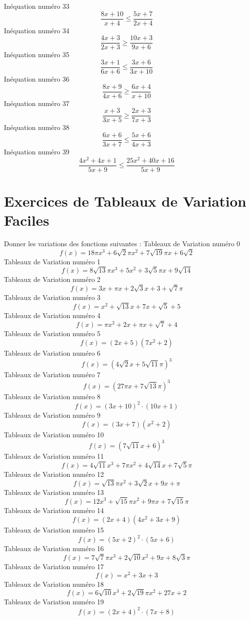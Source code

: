 \documentclass{article}
\begin{document}
\]In\'equation num\'ero 33 \[\frac{8 x + 10}{x + 4} \leq \frac{5 x + 7}{2 x + 4}\]In\'equation num\'ero 34 \[\frac{4 x + 3}{2 x + 3} \geq \frac{10 x + 3}{9 x + 6}\]In\'equation num\'ero 35 \[\frac{3 x + 1}{6 x + 6} \leq \frac{3 x + 6}{3 x + 10}\]In\'equation num\'ero 36 \[\frac{8 x + 9}{4 x + 6} \geq \frac{6 x + 4}{x + 10}\]In\'equation num\'ero 37 \[\frac{x + 3}{3 x + 5} \geq \frac{2 x + 3}{7 x + 3}\]In\'equation num\'ero 38 \[\frac{6 x + 6}{3 x + 7} \leq \frac{5 x + 6}{4 x + 3}\]In\'equation num\'ero 39 \[\frac{4 x^{2} + 4 x + 1}{5 x + 9} \leq \frac{25 x^{2} + 40 x + 16}{5 x + 9}\]
 \section{Exercices de Tableaux de Variation Faciles}

 Donner les variations des fonctions suivantes : 
Tableaux de Variation num\'ero 0 \[f(x) = 18 \pi x^{3} + 6 \sqrt{2} \pi x^{2} + 7 \sqrt{19} \pi x + 6 \sqrt{2}\]Tableaux de Variation num\'ero 1 \[f(x) = 8 \sqrt{13} \pi x^{3} + 5 x^{2} + 3 \sqrt{5} \pi x + 9 \sqrt{14}\]Tableaux de Variation num\'ero 2 \[f(x) = 3 x + \pi x + 2 \sqrt{3} x + 3 + \sqrt{7} \pi\]Tableaux de Variation num\'ero 3 \[f(x) = x^{2} + \sqrt{13} x + 7 x + \sqrt{5} + 5\]Tableaux de Variation num\'ero 4 \[f(x) = \pi x^{2} + 2 x + \pi x + \sqrt{7} + 4\]Tableaux de Variation num\'ero 5 \[f(x) = \left(2 x + 5\right) \left(7 x^{2} + 2\right)\]Tableaux de Variation num\'ero 6 \[f(x) = \left(4 \sqrt{2} x + 5 \sqrt{11} \pi\right)^{3}\]Tableaux de Variation num\'ero 7 \[f(x) = \left(27 \pi x + 7 \sqrt{13} \pi\right)^{3}\]Tableaux de Variation num\'ero 8 \[f(x) = \left(3 x + 10\right)^{2} \cdot \left(10 x + 1\right)\]Tableaux de Variation num\'ero 9 \[f(x) = \left(3 x + 7\right) \left(x^{2} + 2\right)\]Tableaux de Variation num\'ero 10 \[f(x) = \left(7 \sqrt{11} x + 6\right)^{3}\]Tableaux de Variation num\'ero 11 \[f(x) = 4 \sqrt{11} x^{3} + 7 \pi x^{2} + 4 \sqrt{14} x + 7 \sqrt{5} \pi\]Tableaux de Variation num\'ero 12 \[f(x) = \sqrt{13} \pi x^{2} + 3 \sqrt{2} x + 9 x + \pi\]Tableaux de Variation num\'ero 13 \[f(x) = 12 x^{3} + \sqrt{15} \pi x^{2} + 9 \pi x + 7 \sqrt{15} \pi\]Tableaux de Variation num\'ero 14 \[f(x) = \left(2 x + 4\right) \left(4 x^{2} + 3 x + 9\right)\]Tableaux de Variation num\'ero 15 \[f(x) = \left(5 x + 2\right)^{2} \cdot \left(5 x + 6\right)\]Tableaux de Variation num\'ero 16 \[f(x) = 7 \sqrt{7} \pi x^{3} + 2 \sqrt{10} x^{2} + 9 x + 8 \sqrt{3} \pi\]Tableaux de Variation num\'ero 17 \[f(x) = x^{2} + 3 x + 3\]Tableaux de Variation num\'ero 18 \[f(x) = 6 \sqrt{10} x^{3} + 2 \sqrt{19} \pi x^{2} + 27 x + 2\]Tableaux de Variation num\'ero 19 \[f(x) = \left(2 x + 4\right)^{2} \cdot \left(7 x + 8\right)\]
\end{document}
